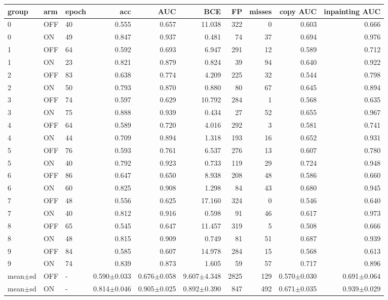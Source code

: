 \begin{tabular}{lllrrrrrrr}
\toprule
group & arm & epoch & acc & AUC & BCE & FP & misses & copy AUC & inpainting AUC \\
\midrule
0 & OFF & 40 & 0.555 & 0.657 & 11.038 & 322 & 0 & 0.603 & 0.666 \\
0 & ON & 49 & 0.847 & 0.937 & 0.481 & 74 & 37 & 0.694 & 0.976 \\
1 & OFF & 64 & 0.592 & 0.693 & 6.947 & 291 & 12 & 0.589 & 0.712 \\
1 & ON & 23 & 0.821 & 0.879 & 0.824 & 39 & 94 & 0.640 & 0.922 \\
2 & OFF & 83 & 0.638 & 0.774 & 4.209 & 225 & 32 & 0.544 & 0.798 \\
2 & ON & 50 & 0.793 & 0.870 & 0.880 & 80 & 67 & 0.645 & 0.894 \\
3 & OFF & 74 & 0.597 & 0.629 & 10.792 & 284 & 1 & 0.568 & 0.635 \\
3 & ON & 75 & 0.888 & 0.939 & 0.434 & 27 & 52 & 0.655 & 0.967 \\
4 & OFF & 64 & 0.589 & 0.720 & 4.016 & 292 & 3 & 0.581 & 0.741 \\
4 & ON & 44 & 0.709 & 0.894 & 1.318 & 193 & 16 & 0.652 & 0.931 \\
5 & OFF & 76 & 0.593 & 0.761 & 6.537 & 276 & 13 & 0.607 & 0.780 \\
5 & ON & 40 & 0.792 & 0.923 & 0.733 & 119 & 29 & 0.724 & 0.948 \\
6 & OFF & 86 & 0.647 & 0.650 & 8.938 & 208 & 48 & 0.586 & 0.660 \\
6 & ON & 60 & 0.825 & 0.908 & 1.298 & 84 & 43 & 0.680 & 0.945 \\
7 & OFF & 48 & 0.556 & 0.625 & 17.160 & 324 & 0 & 0.546 & 0.640 \\
7 & ON & 40 & 0.812 & 0.916 & 0.598 & 91 & 46 & 0.617 & 0.973 \\
8 & OFF & 65 & 0.545 & 0.647 & 11.457 & 319 & 5 & 0.508 & 0.666 \\
8 & ON & 48 & 0.815 & 0.909 & 0.749 & 81 & 51 & 0.687 & 0.939 \\
9 & OFF & 84 & 0.585 & 0.607 & 14.978 & 284 & 15 & 0.568 & 0.613 \\
9 & ON & 74 & 0.839 & 0.873 & 1.605 & 59 & 57 & 0.717 & 0.896 \\
mean$\pm$sd & OFF & - & 0.590$\pm$0.033 & 0.676$\pm$0.058 & 9.607$\pm$4.348 & 2825 & 129 & 0.570$\pm$0.030 & 0.691$\pm$0.064 \\
mean$\pm$sd & ON & - & 0.814$\pm$0.046 & 0.905$\pm$0.025 & 0.892$\pm$0.390 & 847 & 492 & 0.671$\pm$0.035 & 0.939$\pm$0.029 \\
\bottomrule
\end{tabular}

